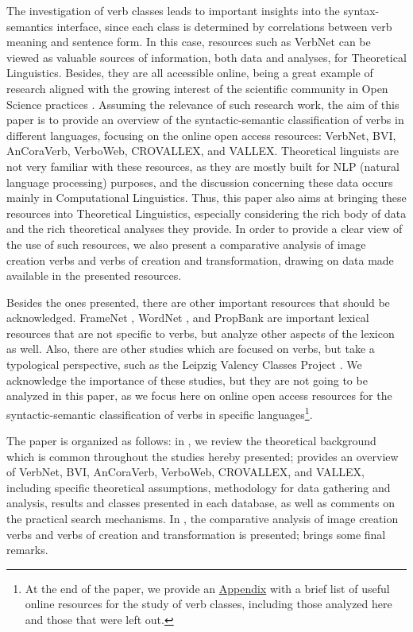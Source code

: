 \documentclass[english]{textolivre}
\begin{document}
The investigation of verb classes leads to important insights into the syntax-semantics interface, since each class is determined by correlations between verb meaning and sentence form. In this case, resources such as VerbNet can be viewed as valuable sources of information, both data and analyses, for Theoretical Linguistics. Besides, they are all accessible online, being a great example of research aligned with the growing interest of the scientific community in Open Science practices \cite{serrapilheira_guia_2020}. Assuming the relevance of such research work, the aim of this paper is to provide an overview of the syntactic-semantic classification of verbs in different languages, focusing on the online open access resources: VerbNet, BVI, AnCoraVerb, VerboWeb, CROVALLEX, and VALLEX. Theoretical linguists are not very familiar with these resources, as they are mostly built for NLP (natural language processing) purposes, and the discussion concerning these data occurs mainly in Computational Linguistics. Thus, this paper also aims at bringing these resources into Theoretical Linguistics, especially considering the rich body of data and the rich theoretical analyses they provide. In order to provide a clear view of the use of such resources, we also present a comparative analysis of image creation verbs and verbs of creation and transformation, drawing on data made available in the presented resources.

Besides the ones presented, there are other important resources that should be acknowledged. FrameNet \cite{ruppenhofer_framenet_2016}, WordNet \cite{fellbaum_wordnet:_1998}, and PropBank \cite{bonial_propbank:_2014} are important lexical resources that are not specific to verbs, but analyze other aspects of the lexicon as well. Also, there are other studies which are focused on verbs, but take a typological perspective, such as the Leipzig Valency Classes Project \cite{hartmann_valency_2013,malchukov_introducing_2015}. We acknowledge the importance of these studies, but they are not going to be analyzed in this paper, as we focus here on online open access resources for the syntactic-semantic classification of verbs in specific languages\footnote{At the end of the paper, we provide an \hyperref[appendixA]{Appendix} with a brief list of useful online resources for the study of verb classes, including those analyzed here and those that were left out.}.

The paper is organized as follows: in , we review the theoretical background which is common throughout the studies hereby presented;  provides an overview of VerbNet, BVI, AnCoraVerb, VerboWeb, CROVALLEX, and VALLEX, including specific theoretical assumptions, methodology for data gathering and analysis, results and classes presented in each database, as well as comments on the practical search mechanisms. In , the comparative analysis of image creation verbs and verbs of creation and transformation is presented;  brings some final remarks.
\end{document}
